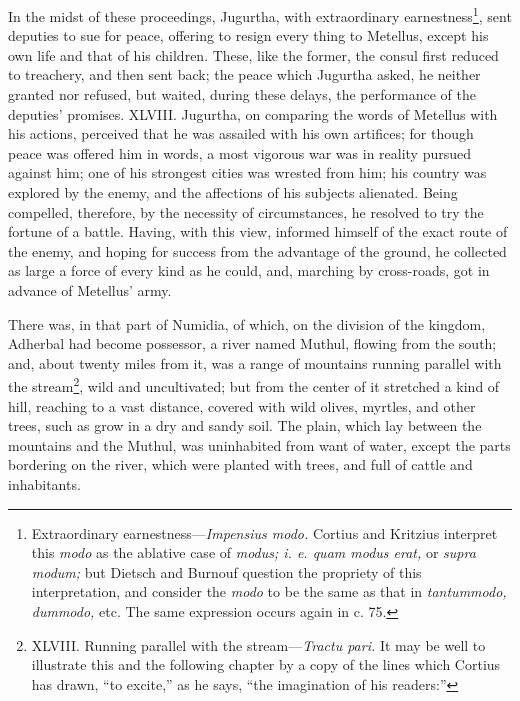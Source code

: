 In the midst of these proceedings, Jugurtha, with extraordinary
earnestness\footnote{Extraordinary earnestness—\emph{Impensius modo.} Cortius and
Kritzius interpret this \emph{modo} as the ablative case of \emph{modus; i. e.
quam modus erat,} or \emph{supra modum;} but Dietsch and Burnouf question
the propriety of this interpretation, and consider the \emph{modo} to be
the same as that in \emph{tantummodo, dummodo,} etc. The same expression
occurs again in c. 75.}, sent deputies to sue for peace, offering to resign
every thing to Metellus, except his own life and that of his children.
These, like the former, the consul first reduced to treachery, and
then sent back; the peace which Jugurtha asked, he neither granted nor
refused, but waited, during these delays, the performance of the
deputies' promises. XLVIII. Jugurtha, on comparing the words of
Metellus with his actions, perceived that he was assailed with his own
artifices; for though peace was offered him in words, a most vigorous
war was in reality pursued against him; one of his strongest cities
was wrested from him; his country was explored by the enemy, and the
affections of his subjects alienated. Being compelled, therefore, by
the necessity of circumstances, he resolved to try the fortune of a
battle. Having, with this view, informed himself of the exact route of
the enemy, and hoping for success from the advantage of the ground, he
collected as large a force of every kind as he could, and, marching by
cross-roads, got in advance of Metellus' army.

There was, in that part of Numidia, of which, on the division of the
kingdom, Adherbal had become possessor, a river named Muthul, flowing
from the south; and, about twenty miles from it, was a range of
mountains running parallel with the stream\footnote{XLVIII. Running parallel with the stream—\emph{Tractu pari.} It
may be well to illustrate this and the following chapter by a copy of
the lines which Cortius has drawn, ``to excite,'' as he says, ``the
imagination of his readers:''}, wild and
uncultivated; but from the center of it stretched a kind of hill,
reaching to a vast distance, covered with wild olives, myrtles, and
other trees, such as grow in a dry and sandy soil. The plain, which
lay between the mountains and the Muthul, was uninhabited from want of
water, except the parts bordering on the river, which were planted
with trees, and full of cattle and inhabitants.

